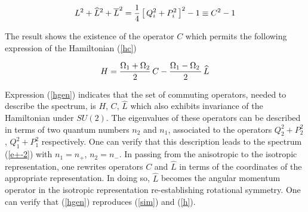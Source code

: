 \documentclass[a4paper,aps,prd,preprint]{revtex4}
\begin{document}
     
     \begin{equation}
     L^2 + \widehat L^2 + \overline L^2 =
     {1\over 4}\left[\, Q_i^2 + P_i^2\,\right]^2 -1 \equiv C^2 -1
     \end{equation}
    
    The result shows the existence of the operator $C$ which permits
    the following expression of the Hamiltonian (\ref{hc}) 
     
     \begin{equation}
    H={ \Omega_1 + \Omega_2\over 2}\, C -  {\Omega_1 -\Omega_2\,\over 2}\, 
    \widehat L
    \label{hgen}
    \end{equation}
    
    Expression (\ref{hgen}) indicates that the  set of commuting  
    operators, needed to describe the spectrum, is $H$, $C$, $\widehat L$ which
    also exhibits invariance of the Hamiltonian under $SU(2)$.
   The eigenvalues of these operators can be described in terms of two quantum 
   numbers  $n_2$ and $n_1$, associated to the operators  $Q_2^2+ P_2^2$,
   $Q_1^2+ P_1^2$ respectively. One can verify that this description leads to
   the spectrum (\ref{e+-2}) with $n_1 =n_+$,  $n_2 =n_-$. In passing from the 
   anisotropic to the isotropic  representation, one rewrites
   operators $C$ and $\widehat L$ in terms of the  coordinates of the 
   appropriate representation. In doing so, $\widehat L$ becomes the angular
    momentum operator in the isotropic representation re-establishing 
    rotational symmetry. One can verify that (\ref{hgen}) reproduces (\ref{sim})
    and (\ref{h}).\\
    
\end{document}

